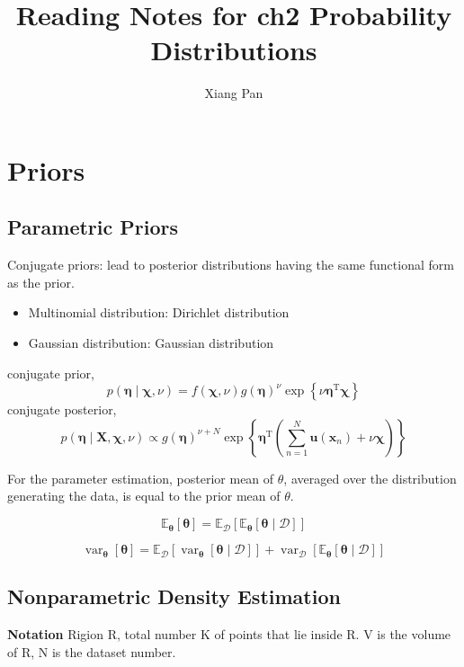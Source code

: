 \documentclass{article}
\title{Reading Notes for ch2 Probability Distributions}
\author{Xiang Pan}
\begin{document}
\maketitle
\section{Priors}
\subsection{Parametric Priors}

Conjugate priors: lead to posterior distributions having the same functional form as the prior.
\begin{itemize}
    \item Multinomial distribution: Dirichlet distribution
    \item Gaussian distribution: Gaussian distribution
\end{itemize}


conjugate prior,
$$
p(\boldsymbol{\eta} \mid \boldsymbol{\chi}, \nu)=f(\boldsymbol{\chi}, \nu) g(\boldsymbol{\eta})^{\nu} \exp \left\{\nu \boldsymbol{\eta}^{\mathrm{T}} \boldsymbol{\chi}\right\}
$$
conjugate posterior,
$$
p(\boldsymbol{\eta} \mid \mathbf{X}, \boldsymbol{\chi}, \nu) \propto g(\boldsymbol{\eta})^{\nu+N} \exp \left\{\boldsymbol{\eta}^{\mathrm{T}}\left(\sum_{n=1}^{N} \mathbf{u}\left(\mathbf{x}_{n}\right)+\nu \boldsymbol{\chi}\right)\right\}
$$

For the parameter estimation, posterior mean of $\theta$, averaged over the distribution generating the data, is equal to the prior mean of $\theta$.

$$
\mathbb{E}_{\boldsymbol{\theta}}[\boldsymbol{\theta}]=\mathbb{E}_{\mathcal{D}}\left[\mathbb{E}_{\boldsymbol{\theta}}[\boldsymbol{\theta} \mid \mathcal{D}]\right]
$$

$$
\operatorname{var}_{\boldsymbol{\theta}}[\boldsymbol{\theta}]=\mathbb{E}_{\mathcal{D}}\left[\operatorname{var}_{\boldsymbol{\theta}}[\boldsymbol{\theta} \mid \mathcal{D}]\right]+\operatorname{var}_{\mathcal{D}}\left[\mathbb{E}_{\boldsymbol{\theta}}[\boldsymbol{\theta} \mid \mathcal{D}]\right]
$$

\subsection{Nonparametric Density Estimation}
\textbf{Notation}
Rigion R, total number K of points that lie inside R. V is the volume of R, N is the dataset number.
\end{document}
